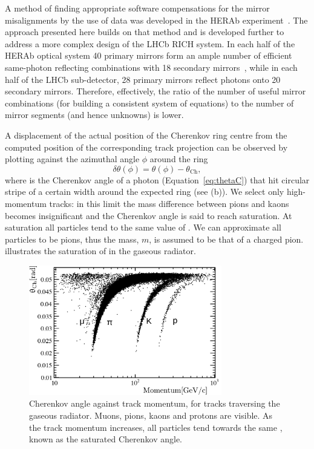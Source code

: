 A method of finding appropriate software compensations for the mirror
misalignments by the use of data was developed in the HERAb
experiment~\cite{Gorisek:1999td}. The approach presented here builds on that
method and is developed further to address a more complex design of the LHCb
RICH system. In each half of the HERAb optical system 40 primary mirrors form an
ample number of efficient same-photon reflecting combinations with 18 secondary
mirrors~\cite{Arino:2003in}, while in each half of the LHCb \richtwo
sub-detector, 28 primary mirrors reflect photons onto 20 secondary mirrors.
Therefore, effectively, the ratio of the number of useful mirror combinations
(for building a consistent system of equations) to the number of mirror segments
(and hence unknowns) is lower.

A displacement of the actual position of the Cherenkov ring centre from the
computed position of the corresponding track projection can be observed by
plotting \deltatheta against the azimuthal angle $\phi$ around the ring
\begin{equation*}
  \delta\theta\left(\phi\right) = \theta\left(\phi\right) - \theta_{\mathrm{Ch}},
\end{equation*}
where \thetaC is the Cherenkov angle of a photon (Equation~\ref{eq:thetaC}) that
hit circular stripe of a certain width around the expected ring (see
 (b)). We select only high-momentum tracks:
in this limit the mass difference between pions and kaons becomes insignificant
and the Cherenkov angle is said to reach saturation. At saturation all particles
tend to the same value of \thetaC. We can approximate all particles to be pions,
thus the mass, $m$, is assumed to be that of a charged pion.
 illustrates the saturation of
\thetaC in the \richone gaseous radiator.
\begin{figure}[htbp]
  \vspace{-0.5\baselineskip}
  \centering
  \includegraphics[width=0.75\textwidth]{figs/Method/ThetaVsMomentum_C4F10}
  \vspace{-0.5\baselineskip}
  \caption{
    Cherenkov angle \thetaC against track momentum, for tracks traversing the
    \richone gaseous radiator. Muons, pions, kaons and protons are visible. As
    the track momentum  increases, all particles tend towards the same \thetaC,
    known as the saturated Cherenkov angle.}
  \label{fig:saturation}
  \vspace{-0.5\baselineskip}
\end{figure}
